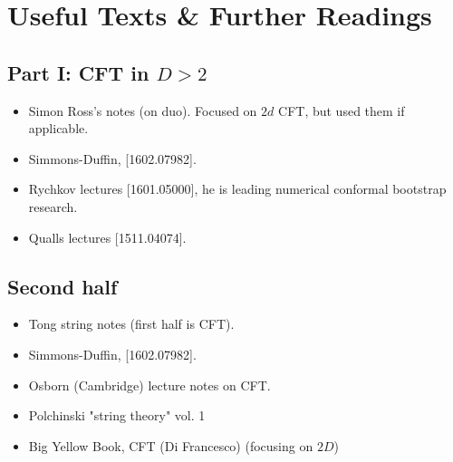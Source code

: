 \chapter*{Useful Texts \& Further Readings}

\section*{Part I: CFT in $D>2$}

\begin{itemize}
    \item Simon Ross's notes (on duo). Focused on $2d$ CFT, but used them if applicable.
    \item Simmons-Duffin, [1602.07982].
    \item Rychkov lectures [1601.05000], he is leading numerical conformal bootstrap research.
    \item Qualls lectures [1511.04074].
\end{itemize}

\section*{Second half}
\begin{itemize}
    \item Tong string notes (first half is CFT).
    \item Simmons-Duffin, [1602.07982].
    \item Osborn (Cambridge) lecture notes on CFT.
    \item Polchinski "string theory" vol. 1
    \item Big Yellow Book, CFT (Di Francesco) (focusing on $2D$)
\end{itemize}



